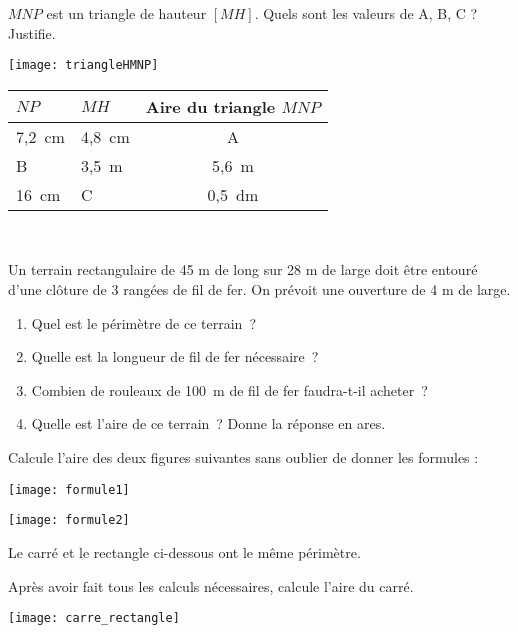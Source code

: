 \begin{exercice}
\begin{minipage}[c]{0.48\linewidth}
$MNP$ est un triangle de hauteur $[MH]$. Quels sont les valeurs de A, B, C ? Justifie.
 \end{minipage} \hfill%
 \begin{minipage}[c]{0.48\linewidth}
\begin{center} \texttt{[image: triangleHMNP]} \end{center} 
  \end{minipage}
\begin{tabularx}{\linewidth}{|X|X|c|}
\hline
\textbf{$NP$} & \textbf{$MH$} & \textbf{Aire du triangle $MNP$} \\\hline
7,2 cm & 4,8 cm & A \\\hline
B & 3,5 m & 5,6 m\up{2} \\\hline
16 cm & C & 0,5 dm\up{2} \\\hline
 \end{tabularx} \\
\end{exercice}


\begin{exercice}
Un terrain rectangulaire de 45 m de long sur 28 m de large doit être entouré d’une clôture de 3 rangées de fil de fer. On prévoit une ouverture de 4 m de large.
\begin{enumerate}
 \item Quel est le périmètre de ce terrain ?
 \item Quelle est la longueur de fil de fer nécessaire ?
 \item Combien de rouleaux de 100 m de fil de fer faudra-t-il acheter ?
 \item Quelle est l’aire de ce terrain ? Donne la réponse en ares.
 \end{enumerate}
\end{exercice}


\begin{exercice}
Calcule l'aire des deux figures suivantes sans oublier de donner les formules :
\begin{center} \texttt{[image: formule1]} \end{center} 
\begin{center} \texttt{[image: formule2]} \end{center} 
\end{exercice}


\begin{exercice}
Le carré et le rectangle ci-dessous ont le même périmètre.
     
Après avoir fait tous les calculs nécessaires, calcule l’aire du carré.
\begin{center} \texttt{[image: carre\_rectangle]} \end{center} 
\end{exercice}



